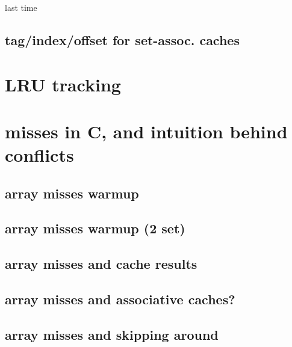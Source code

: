 \date{}
\title{}
\date{}

\begin{frame}
    \titlepage
\end{frame}



\usetikzlibrary{calc}

\begin{frame}{last time}
\end{frame}

\subsection{tag/index/offset for set-assoc. caches}


\section{LRU tracking}


\section{misses in C, and intuition behind conflicts}


\subsection{array misses warmup}


\subsection{array misses warmup (2 set)}



\subsection{array misses and cache results}


\subsection{array misses and associative caches?}


\subsection{array misses and skipping around}


